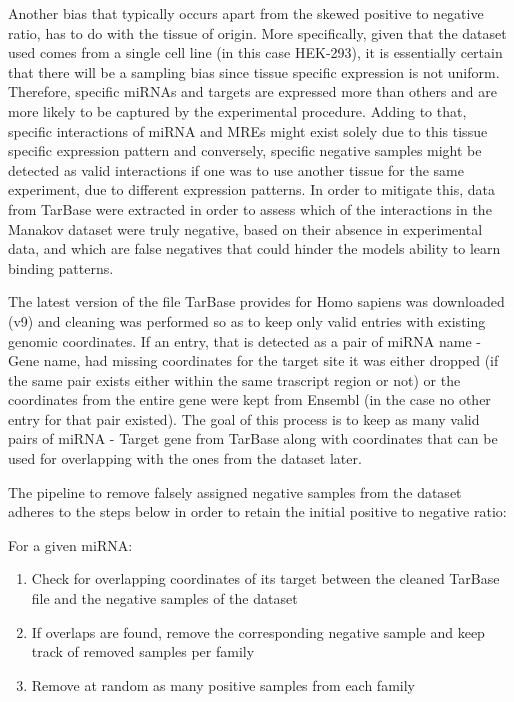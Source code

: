 \documentclass[en,ack]{dimscthesis}
\begin{document}
\par Another bias that typically occurs apart from the skewed positive to negative ratio, has to do with the tissue of origin. More specifically, given that the dataset used comes from a single cell line (in this case HEK-293), it is essentially certain that there will be a sampling bias since tissue specific expression is not uniform. Therefore, specific miRNAs and targets are expressed more than others and are more likely to be captured by the experimental procedure. Adding to that, specific interactions of miRNA and MREs might exist solely due to this tissue specific expression pattern and conversely, specific negative samples might be detected as valid interactions if one was to use another tissue for the same experiment, due to different expression patterns. In order to mitigate this, data from TarBase \parencite{sethupathyTarBaseComprehensiveDatabase2006} were extracted in order to assess which of the interactions in the Manakov dataset were truly negative, based on their absence in experimental data, and which are false negatives that could hinder the models ability to learn binding patterns.
\newpage

\par The latest version of the file TarBase provides for Homo sapiens was downloaded (v9) and cleaning was performed so as to keep only valid entries with existing genomic coordinates. If an entry, that is detected as a pair of miRNA name - Gene name, had missing coordinates for the target site it was either dropped (if the same pair exists either within the same trascript region or not) or the coordinates from the entire gene were kept from Ensembl (in the case no other entry for that pair existed). The goal of this process is to keep as many valid pairs of miRNA - Target gene from TarBase along with coordinates that can be used for overlapping with the ones from the dataset later.

The pipeline to remove falsely assigned negative samples from the dataset adheres to the steps below in order to retain the initial positive to negative ratio:

	For a given miRNA:
	\begin{enumerate}
		\item Check for overlapping coordinates of its target between the cleaned TarBase file and the negative samples of the dataset
		\item If overlaps are found, remove the corresponding negative sample and keep track of removed samples per family
		\item Remove at random as many positive samples from each family 
	\end{enumerate}
\end{document}
